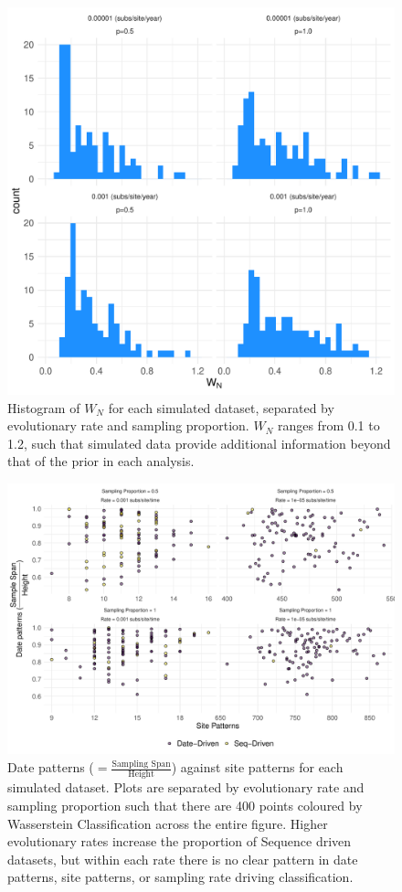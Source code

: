 \documentclass{article}
\begin{document}
\begin{figure}[H]
\centering
\includegraphics[width=1\linewidth]{figures/wnHist.pdf}
\caption{Histogram of $W_N$ for each simulated dataset, separated by evolutionary rate and sampling proportion. $W_N$ ranges from 0.1 to 1.2, such that simulated data provide additional information beyond that of the prior in each analysis.}
\label{fig:wnHist}
\end{figure}

\begin{figure}[H]
\centering
\includegraphics[width=1\linewidth]{figures/seqDatePatterns.pdf}
\caption{Date patterns ($=\frac{\text{Sampling Span}}{\text{Height}}$) against site patterns for each simulated dataset. Plots are separated by evolutionary rate and sampling proportion such that there are 400 points coloured by Wasserstein Classification across the entire figure. Higher evolutionary rates increase the proportion of Sequence driven datasets, but within each rate there is no clear pattern in date patterns, site patterns, or sampling rate driving classification.}
\label{fig:patterns}
\end{figure}
\end{document}
